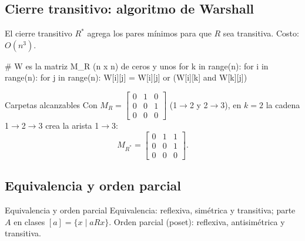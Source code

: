 \subsection{Cierre transitivo: algoritmo de Warshall}
El cierre transitivo $R^*$ agrega los pares m\'inimos para que $R$ sea transitiva. Costo: $O(n^3)$.

\begin{tmcodigo}
# W es la matriz M_R (n x n) de ceros y unos
for k in range(n):
    for i in range(n):
        for j in range(n):
            W[i][j] = W[i][j] or (W[i][k] and W[k][j])
\end{tmcodigo}

\begin{tmejemplo}{Carpetas alcanzables}
Con $M_R=\begin{bmatrix}0&1&0\\0&0&1\\0&0&0\end{bmatrix}$ (1$\to$2 y 2$\to$3), en $k=2$ la cadena 1$\to$2$\to$3 crea la arista 1$\to$3:
\[M_{R^*}=\begin{bmatrix}0&1&1\\0&0&1\\0&0&0\end{bmatrix}.\]
\end{tmejemplo}

\subsection{Equivalencia y orden parcial}
\begin{tmdef}{Equivalencia y orden parcial}
Equivalencia: reflexiva, sim\'etrica y transitiva; parte $A$ en clases $[a]=\{x\mid aRx\}$. Orden parcial (poset): reflexiva, antisim\'etrica y transitiva.
\end{tmdef}

\begin{center}
\end{center}

